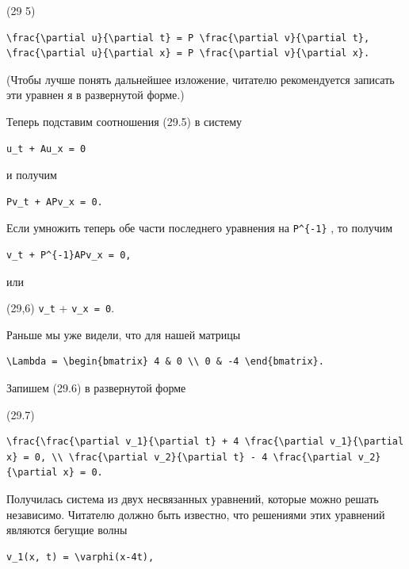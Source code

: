 \documentclass[
  ukrainian,
]{article}
\begin{document}
(29 5)

\begin{verbatim}
\frac{\partial u}{\partial t} = P \frac{\partial v}{\partial t},
\frac{\partial u}{\partial x} = P \frac{\partial v}{\partial x}.
\end{verbatim}

(Чтобы лучше понять дальнейшее изложение, читателю рекомендуется
записать эти уравнен я в развернутой форме.)

Теперь подставим соотношения (29.5) в систему

\begin{verbatim}
u_t + Au_x = 0
\end{verbatim}

и получим

\begin{verbatim}
Pv_t + APv_x = 0.
\end{verbatim}

Если умножить теперь обе части последнего уравнения на
\texttt{P\^{}\{-1\}} , то получим

\begin{verbatim}
v_t + P^{-1}APv_x = 0,
\end{verbatim}

или

(29,6) \texttt{v\_t} +  \texttt{v\_x\ =\ 0}.

Раньше мы уже видели, что для нашей матрицы

\begin{verbatim}
\Lambda = \begin{bmatrix} 4 & 0 \\ 0 & -4 \end{bmatrix}.
\end{verbatim}

Запишем (29.6) в развернутой форме

(29.7)

\begin{verbatim}
\frac{\frac{\partial v_1}{\partial t} + 4 \frac{\partial v_1}{\partial x} = 0, \\ \frac{\partial v_2}{\partial t} - 4 \frac{\partial v_2}{\partial x} = 0.
\end{verbatim}

Получилась система из двух несвязанных уравнений, которые можно решать
независимо. Читателю должно быть известно, что решениями этих уравнений
являются бегущие волны

\begin{verbatim}
v_1(x, t) = \varphi(x-4t),
\end{verbatim}
\end{document}
